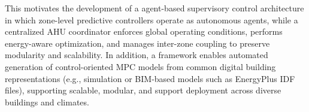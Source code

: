 \documentclass[twocolumn,11pt,a4paper]{article}
\begin{document}
This motivates the development of a agent-based supervisory control architecture in which zone-level predictive controllers operate as autonomous agents, while a centralized AHU coordinator enforces global operating conditions, performs energy-aware optimization, and manages inter-zone coupling to preserve modularity and scalability. In addition, a framework enables automated generation of control-oriented MPC models from common digital building representations (e.g., simulation or BIM-based models such as EnergyPlus IDF files), supporting scalable, modular, and support deployment across diverse buildings and climates.



\end{document}
